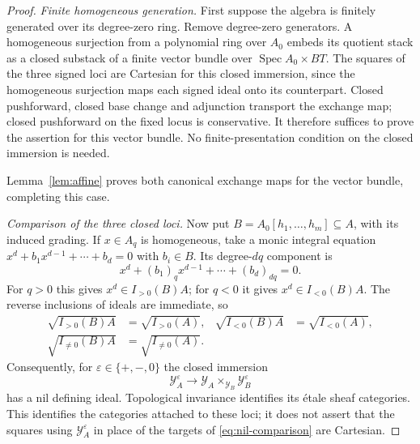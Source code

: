 \documentclass[11pt,a4paper]{article}
\newcommand{\Spec}{\operatorname{Spec}}
\newcommand{\cY}{\mathscr Y}
\theoremstyle{notes}
\begin{document}
\begin{proof}
\emph{Finite homogeneous generation.}
First suppose the algebra is finitely generated over its degree-zero ring. Remove degree-zero generators. A homogeneous surjection from a polynomial ring over $A_0$ embeds its quotient stack as a closed substack of a finite vector bundle over $\Spec A_0\times BT$. The squares of the three signed loci are Cartesian for this closed immersion, since the homogeneous surjection maps each signed ideal onto its counterpart. Closed pushforward, closed base change and adjunction transport the exchange map; closed pushforward on the fixed locus is conservative. It therefore suffices to prove the assertion for this vector bundle. No finite-presentation condition on the closed immersion is needed.

Lemma~\ref{lem:affine} proves both canonical exchange maps for the vector bundle, completing this case.

\emph{Comparison of the three closed loci.}
Now put $B=A_0[h_1,\ldots,h_m]\subseteq A$, with its induced grading. If $x\in A_q$ is homogeneous, take a monic integral equation $x^d+b_1x^{d-1}+\cdots+b_d=0$ with $b_i\in B$. Its degree-$dq$ component is
\[
x^d+(b_1)_q x^{d-1}+\cdots+(b_d)_{dq}=0.
\]
For $q>0$ this gives $x^d\in I_{>0}(B)A$; for $q<0$ it gives $x^d\in I_{<0}(B)A$. The reverse inclusions of ideals are immediate, so
\begin{equation}\label{eq:radicals}
\begin{aligned}
\sqrt{I_{>0}(B)A}&=\sqrt{I_{>0}(A)},&
\sqrt{I_{<0}(B)A}&=\sqrt{I_{<0}(A)},\\
\sqrt{I_{\ne0}(B)A}&=\sqrt{I_{\ne0}(A)}.&&
\end{aligned}
\end{equation}
Consequently, for $\varepsilon\in\{+,-,0\}$ the closed immersion
\begin{equation}\label{eq:nil-comparison}
\cY_A^\varepsilon\longrightarrow\cY_A\times_{\cY_B}\cY_B^\varepsilon
\end{equation}
has a nil defining ideal. Topological invariance identifies its étale sheaf categories. This identifies the categories attached to these loci; it does not assert that the squares using $\cY_A^\varepsilon$ in place of the targets of \eqref{eq:nil-comparison} are Cartesian.


\end{proof}
\end{document}
